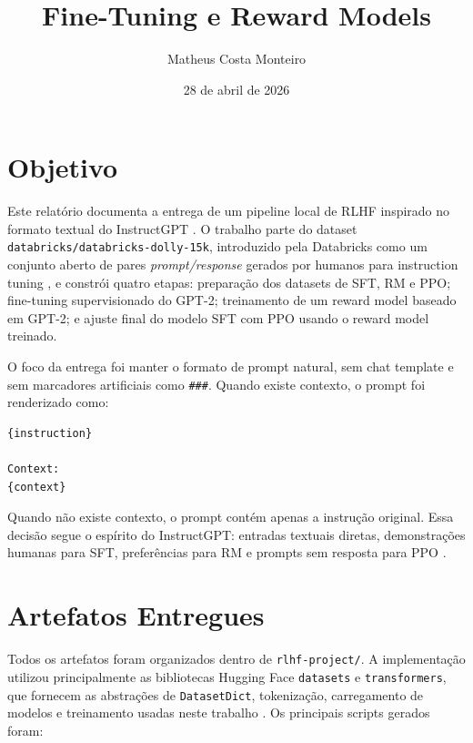 \documentclass[a4paper,12pt]{article}
\begin{document}
\title{Fine-Tuning e Reward Models}
\author{Matheus Costa Monteiro}
\date{28 de abril de 2026}

\section{Objetivo}

Este relatório documenta a entrega de um pipeline local de RLHF inspirado no formato textual do InstructGPT \cite{ouyang2022training}. O trabalho parte do dataset \texttt{databricks/databricks-dolly-15k}, introduzido pela Databricks como um conjunto aberto de pares \textit{prompt/response} gerados por humanos para instruction tuning \cite{databricks2023dolly,databricksDolly15k}, e constrói quatro etapas: preparação dos datasets de SFT, RM e PPO; fine-tuning supervisionado do GPT-2; treinamento de um reward model baseado em GPT-2; e ajuste final do modelo SFT com PPO usando o reward model treinado.

O foco da entrega foi manter o formato de prompt natural, sem chat template e sem marcadores artificiais como \texttt{\#\#\#}. Quando existe contexto, o prompt foi renderizado como:

\begin{verbatim}
{instruction}

Context:
{context}
\end{verbatim}

Quando não existe contexto, o prompt contém apenas a instrução original. Essa decisão segue o espírito do InstructGPT: entradas textuais diretas, demonstrações humanas para SFT, preferências para RM e prompts sem resposta para PPO \cite{ouyang2022training}.

\section{Artefatos Entregues}

Todos os artefatos foram organizados dentro de \texttt{rlhf-project/}. A implementação utilizou principalmente as bibliotecas Hugging Face \texttt{datasets} e \texttt{transformers}, que fornecem as abstrações de \texttt{DatasetDict}, tokenização, carregamento de modelos e treinamento usadas neste trabalho \cite{lhoest2021datasets,wolf2020transformers}. Os principais scripts gerados foram:
\end{document}

